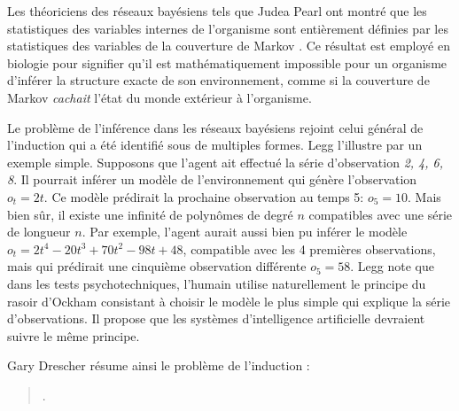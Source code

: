 


Les théoriciens des réseaux bayésiens tels que Judea Pearl ont montré que les statistiques des variables internes de l'organisme sont entièrement définies par les statistiques des variables de la couverture de Markov \cite{pearl_probabilistic_1988}.
Ce résultat est employé en biologie pour signifier qu'il est mathématiquement impossible pour un organisme d'inférer la structure exacte de son environnement, 
comme si la couverture de Markov \emph{cachait} l'état du monde extérieur à l'organisme.

Le problème de l'inférence dans les réseaux bayésiens rejoint celui général de l'induction qui a été identifié sous de multiples formes. 
Legg \cite{legg_universal_2007} l'illustre par un exemple simple. 
Supposons que l'agent ait effectué la série d'observation \emph{2, 4, 6, 8}. 
Il pourrait inférer un modèle de l'environnement qui génère l'observation $o_t = 2t$. 
Ce modèle prédirait la prochaine observation au temps 5: $o_5 = 10$. 
Mais bien sûr, il existe une infinité de polynômes de degré $n$ compatibles avec une série de longueur $n$.
Par exemple, l'agent aurait aussi bien pu inférer le modèle  $o_t = 2t^4 - 20 t^3 + 70t^2 - 98t + 48$, compatible avec les 4 premières observations, mais qui prédirait une cinquième observation différente $o_5 = 58$.
Legg note que dans les tests psychotechniques, l'humain utilise naturellement le principe du rasoir d'Ockham consistant à choisir le modèle le plus simple qui explique la série d'observations. 
Il propose que les systèmes d'intelligence artificielle devraient suivre le même principe.

Gary Drescher résume ainsi le problème de l'induction : 
\begin{quote}
	\cite[p.~174]{drescher_made-up_1991}. 
\end{quote}

